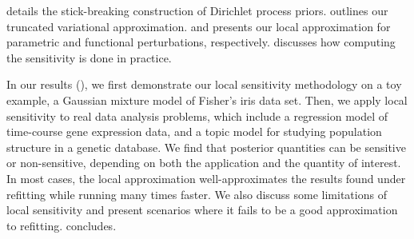  details the stick-breaking construction of Dirichlet process priors.
 outlines our truncated variational approximation.
 and  presents our
local approximation for parametric
and functional perturbations, respectively.
 discusses how computing the sensitivity is done in practice.

In our results (),
we first demonstrate our local sensitivity methodology on
a toy example, a Gaussian mixture model
of Fisher's iris data set.
Then, we apply local sensitivity to real data analysis problems, which include a
regression model of time-course gene expression data,
and a topic model for studying population structure in a genetic database.
We find that posterior quantities can be sensitive or non-sensitive,
depending on both the application and the quantity of interest.
In most cases, the local approximation well-approximates the results found under
refitting while running many times faster.
We also discuss some limitations of local sensitivity
and present scenarios where it fails to be a good approximation to refitting.
 concludes.

